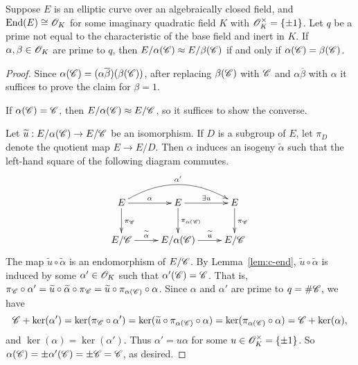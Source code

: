 \documentclass{amsart}
\begin{document}
\begin{lemma}\label{lem:c-subgps-distinct-quotients}
  Suppose $E$ is an elliptic curve over an algebraically closed field, and $\operatorname{End}(E) \cong \mathscr{O}_K$ for some imaginary quadratic field $K$ with $\mathscr{O}_K^\times = \{\pm 1\}$. Let $q$ be a prime not equal to the characteristic of the base field and inert in $K$. If $\alpha,\beta \in \mathscr{O}_K$ are prime to $q$, then $E/\alpha(\mathscr{C}) \approx E/\beta(\mathscr{C})$ if and only if $\alpha(\mathscr{C}) = \beta(\mathscr{C})$.
\end{lemma}
\begin{proof}
 Since $\alpha(\mathscr{C}) = (\alpha\overline{\beta})(\beta(\mathscr{C}))$, after replacing $\beta(\mathscr{C})$ with $\mathscr{C}$ and $\alpha\overline{\beta}$ with $\alpha$ it suffices to prove the claim for $\beta = 1$.

  If $\alpha(\mathscr{C}) = \mathscr{C}$, then $E/\alpha(\mathscr{C}) \approx E/\mathscr{C}$, so it suffices to show the converse.

  Let $\widetilde{u}: E/\alpha(\mathscr{C}) \to E/\mathscr{C}$ be an isomorphism. %
If $D$ is a subgroup of $E$, let $\pi_{D}$ denote the quotient map $E \to E/D$. Then $\alpha$ induces an isogeny $\tilde{\alpha}$
such that the left-hand square of the following diagram commutes.
$$
\xymatrix{
E \ar^{\alpha}[r]  \ar^{\pi_\sC}[d] \ar@/^1.6pc/^{\alpha'}[rr] & E \ar^{\exists u}[r]  \ar^{\pi_{\alpha(\sC)}}[d] & E \ar^{\pi_\sC}[d] \\
E/\sC \ar^-{\tilde{\alpha}}[r] & E/\alpha(\sC) \ar^-{\tilde{u}}[r] & E/\sC
}
$$
The map $\tilde{u}\circ\tilde{\alpha}$ is an endomorphism of $E/\mathscr{C}$. By Lemma~\ref{lem:c-end}, $\tilde{u}\circ\tilde{\alpha}$ is induced by some $\alpha' \in \mathscr{O}_K$ such that $\alpha'(\mathscr{C}) = \mathscr{C}$. That is, $\pi_{\mathscr{C}}\circ\alpha' = \widetilde{u}\circ\widetilde{\alpha}\circ\pi_{\mathscr{C}} = \widetilde{u}\circ\pi_{\alpha(\mathscr{C})}\circ\alpha$.
  Since $\alpha$ and $\alpha'$ are prime to $q = \#\mathscr{C}$, we have
  \[
    \mathscr{C} + \ker(\alpha')
    =
    \ker(\pi_{\mathscr{C}} \circ \alpha')
    =
    \ker(\widetilde{u}\circ\pi_{\alpha(\mathscr{C})}\circ\alpha)
    =
    \ker(\pi_{\alpha(\mathscr{C})}\circ\alpha)
    =
    \mathscr{C} + \ker(\alpha),
  \]
  and $\ker(\alpha) = \ker(\alpha')$. Thus $\alpha' = u\alpha$ for some $u \in \mathscr{O}_K^\times = \{\pm 1\}$. So $\alpha(\mathscr{C}) = \pm\alpha'(\mathscr{C}) = \pm\mathscr{C} = \mathscr{C}$, as desired.

\end{proof}
\end{document}
